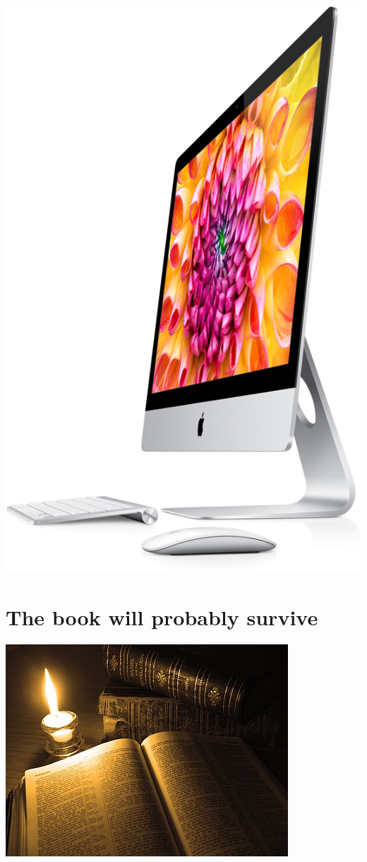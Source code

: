 \documentclass[%
twoside,                 %
draft,                   %
final,                   %
chapterprefix=true,      %
open=right               %
10pt]{book}
\begin{document}
\begin{shadedquoteBlue}



\begin{center}  %
  \centerline{\includegraphics[width=0.7\linewidth]{fig/imac.png}}
\end{center}


\section*{The book will probably survive}


\begin{center}  %
  \centerline{\includegraphics[width=0.9\linewidth]{fig/oldbooks.jpg}}
\end{center}



\end{shadedquoteBlue}
\end{document}
